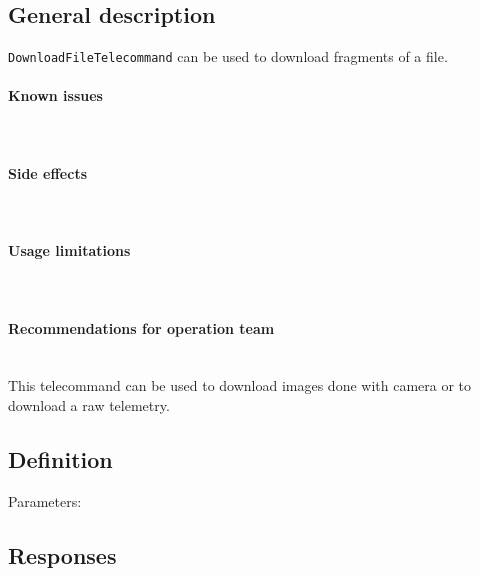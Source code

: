 

\subsection{General description}
\texttt{DownloadFileTelecommand} can be used to download fragments of a file.

\paragraph{Known issues} \mbox{} \\
\None

\paragraph{Side effects} \mbox{} \\
\None

\paragraph{Usage limitations} \mbox{} \\
\None

\paragraph{Recommendations for operation team} \mbox{} \\
This telecommand can be used to download images done with camera or to download a raw telemetry.

\subsection{Definition}

Parameters: 

\begin{tcarglist}
\end{tcarglist}

\subsection{Responses}

